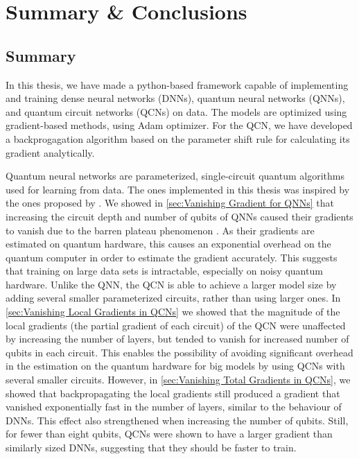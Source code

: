 \chapter{Summary \& Conclusions}\label{chap:Conclusion}

\section{Summary}\label{sec:Summary}
In this thesis, we have made a python-based framework capable of implementing and training dense neural networks (DNNs), quantum neural networks (QNNs), and quantum circuit networks (QCNs) on data. The models are optimized using gradient-based methods, using Adam optimizer. For the QCN, we have developed a backprogagation algorithm based on the parameter shift rule for calculating its gradient analytically.

Quantum neural networks are parameterized, single-circuit quantum algorithms used for learning from data. The ones implemented in this thesis was inspired by the ones proposed by \citet{abbas2020power}. We showed in \cref{sec:Vanishing Gradient for QNNs} that increasing the circuit depth and number of qubits of QNNs caused their gradients to vanish due to the barren plateau phenomenon \cite{McClean_2018}. As their gradients are estimated on quantum hardware, this causes an exponential overhead on the quantum computer in order to estimate the gradient accurately. This suggests that training on large data sets is intractable, especially on noisy quantum hardware. Unlike the QNN, the QCN is able to achieve a larger model size by adding several smaller parameterized circuits, rather than using larger ones. In \cref{sec:Vanishing Local Gradients in QCNs} we showed that the magnitude of the local gradients (the partial gradient of each circuit) of the QCN were unaffected by increasing the number of layers, but tended to vanish for increased number of qubits in each circuit. This enables the possibility of avoiding significant overhead in the estimation on the quantum hardware for big models by using QCNs with several smaller circuits. However, in \cref{sec:Vanishing Total Gradients in QCNs}, we showed that backpropagating the local gradients still produced a gradient that vanished exponentially fast in the number of layers, similar to the behaviour of DNNs. This effect also strengthened when increasing the number of qubits. Still, for fewer than eight qubits, QCNs were shown to have a larger gradient than similarly sized DNNs, suggesting that they should be faster to train.


